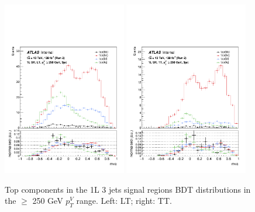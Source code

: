 \begin{figure}[h!]
\center
\includegraphics[width=0.48\textwidth]{Images/VH/top/OneLepton_top_2lttag3jet_SR_250ptv_mva.pdf}
\includegraphics[width=0.48\textwidth]{Images/VH/top/OneLepton_top_2tttag3jet_SR_250ptv_mva.pdf}
\caption{Top components in the 1L 3 jets signal regions BDT distributions in the $\geq$ 250 GeV $p_T^V$ range. Left: LT; right: TT.}
\label{fig:topContentSR}
\end{figure}

